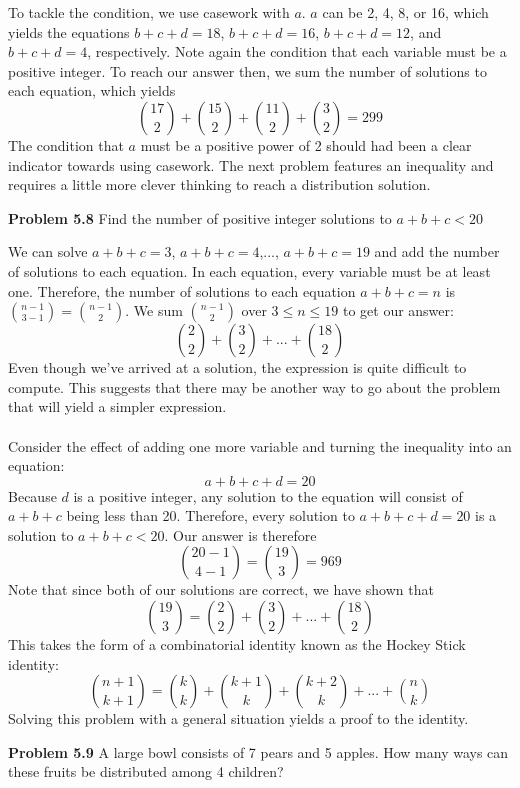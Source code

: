 \documentclass[11pt]{scrartcl}
\begin{document}
\noindent 
To tackle the condition, we use casework with $a$. $a$ can be 2, 4, 8, or 16, which yields the equations $b+c+d=18$, $b+c+d=16$, $b+c+d=12$, and $b+c+d=4$, respectively. Note again the condition that each variable must be a positive integer. To reach our answer then, we sum the number of solutions to each equation, which yields
$${17 \choose 2}+{15 \choose 2}+{11 \choose 2}+{3 \choose 2}=299$$
\noindent 
The condition that $a$ must be a positive power of 2 should had been a clear indicator towards using casework. The next problem features an inequality and requires a little more clever thinking to reach a distribution solution. 
\\
\begin{tcolorbox} 
\textbf{Problem 5.8} Find the number of positive integer solutions to $a+b+c<20$
\end{tcolorbox}
 We can solve $a+b+c=3$, $a+b+c=4$,..., $a+b+c=19$ and add the number of solutions to each equation. In each equation, every variable must be at least one. Therefore, the number of solutions to each equation $a+b+c=n$ is ${{n-1} \choose {3-1}}={{n-1} \choose 2}$. We sum ${{n-1} \choose 2}$ over $3 \leq n \leq 19$ to get our answer: 
$${2 \choose 2}+{3 \choose 2}+...+{18 \choose 2}$$
Even though we've arrived at a solution, the expression is quite difficult to compute. This suggests that there may be another way to go about the problem that will yield a simpler expression. \\
\\
\noindent
Consider the effect of adding one more variable and turning the inequality into an equation:
$$a+b+c+d=20$$
Because $d$ is a positive integer, any solution to the equation will consist of $a+b+c$ being less than 20. Therefore, every solution to $a+b+c+d=20$ is a solution to $a+b+c<20$. Our answer is therefore 
$${{20-1} \choose {4-1}}={19 \choose 3}=969$$
Note that since both of our solutions are correct, we have shown that 
$${{19 \choose 3}={2 \choose 2}+{3 \choose 2}+...+{18 \choose 2}}$$
This takes the form of a combinatorial identity known as the Hockey Stick identity:
$${n+1 \choose k+1}={k \choose k}+{k+1 \choose k}+{k+2 \choose k}+...+{n \choose k}$$
Solving this problem with a general situation yields a proof to the identity. \\
\begin{tcolorbox}
\textbf{Problem 5.9} A large bowl consists of 7 pears and 5 apples. How many ways can these fruits be distributed among 4 children?
\end{tcolorbox}
\end{document}
